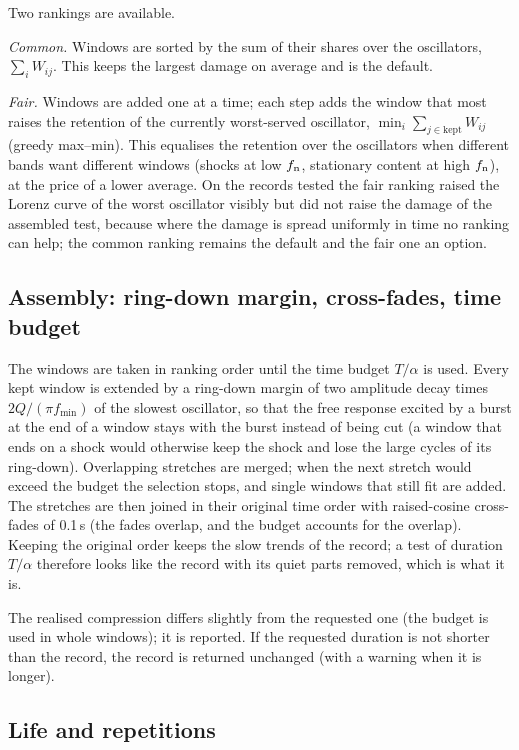 Two rankings are available.

\emph{Common.} Windows are sorted by the sum of their shares over the oscillators, $\sum_i W_{ij}$.
This keeps the largest damage on average and is the default.

\emph{Fair.} Windows are added one at a time; each step adds the window that most raises the retention
of the currently worst-served oscillator, $\min_i\sum_{j\in\text{kept}} W_{ij}$ (greedy max--min).
This equalises the retention over the oscillators when different bands want different windows (shocks
at low $f_{\mathrm{n}}$, stationary content at high $f_{\mathrm{n}}$), at the price of a lower average. On the records tested
the fair ranking raised the Lorenz curve of the worst oscillator visibly but did not raise the damage
of the assembled test, because where the damage is spread uniformly in time no ranking can help; the
common ranking remains the default and the fair one an option.

\subsection{Assembly: ring-down margin, cross-fades, time budget}\label{sec:assembly}

The windows are taken in ranking order until the time budget $T/\alpha$ is used. Every kept window is
extended by a ring-down margin of two amplitude decay times $2Q/(\pi f_{\min})$ of the slowest
oscillator, so that the free response excited by a burst at the end of a window stays with the burst
instead of being cut (a window that ends on a shock would otherwise keep the shock and lose the large
cycles of its ring-down). Overlapping stretches are merged; when the next stretch would exceed the
budget the selection stops, and single windows that still fit are added. The stretches are then joined
in their original time order with raised-cosine cross-fades of 0.1\,s (the fades overlap, and the
budget accounts for the overlap). Keeping the original order keeps the slow trends of the record;
a test of duration $T/\alpha$ therefore looks like the record with its quiet parts removed, which is what
it is.

The realised compression differs slightly from the requested one (the budget is used in whole
windows); it is reported. If the requested duration is not shorter than the record, the record is
returned unchanged (with a warning when it is longer).

\subsection{Life and repetitions}

